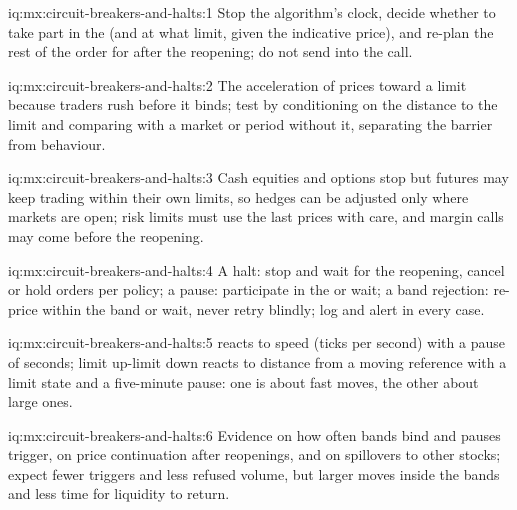 \begin{solution}{iq:mx:circuit-breakers-and-halts:1}
Stop the algorithm's clock, decide whether to take part in the  (and at what limit, given the indicative price), and re-plan the rest
of the order for after the reopening; do not send  into the call.
\end{solution}

\begin{solution}{iq:mx:circuit-breakers-and-halts:2}
The acceleration of prices toward a limit because traders rush before it binds; test by conditioning on the distance to the limit and comparing with a
market or period without it, separating the barrier from behaviour.
\end{solution}

\begin{solution}{iq:mx:circuit-breakers-and-halts:3}
Cash equities and options stop but futures may keep trading within their own limits, so hedges can be adjusted only where markets are open; risk
limits must use the last prices with care, and margin calls may come before the reopening.
\end{solution}

\begin{solution}{iq:mx:circuit-breakers-and-halts:4}
A halt: stop and wait for the reopening, cancel or hold orders per policy; a pause: participate in the  or wait; a band rejection:
re-price within the band or wait, never retry blindly; log and alert in every case.
\end{solution}

\begin{solution}{iq:mx:circuit-breakers-and-halts:5}
 reacts to speed (ticks per second) with a pause of seconds; limit up-limit down reacts to distance from a moving reference with a
limit state and a five-minute pause: one is about fast moves, the other about large ones.
\end{solution}

\begin{solution}{iq:mx:circuit-breakers-and-halts:6}
Evidence on how often bands bind and pauses trigger, on price continuation after reopenings, and on spillovers to other stocks; expect fewer triggers
and less refused volume, but larger moves inside the bands and less time for liquidity to return.
\end{solution}

